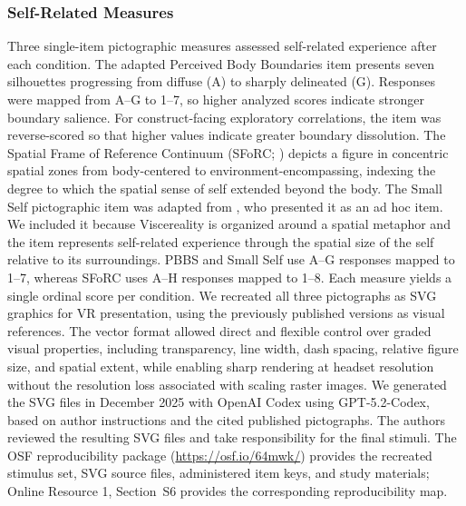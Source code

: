 \documentclass[pdflatex,sn-basic,lineno]{sn-jnl}
\begin{document}
\subsubsection{Self-Related Measures}\label{subsubsec:measures_self}
Three single-item pictographic measures assessed self-related experience after each
condition. The adapted Perceived Body Boundaries item \citep{Dambrun2016} presents seven
silhouettes progressing from diffuse (A) to sharply delineated (G). Responses were mapped
from A--G to 1--7, so higher analyzed scores indicate stronger boundary salience. For
construct-facing exploratory correlations, the item was reverse-scored so that higher
values indicate greater boundary dissolution. The Spatial Frame of Reference
Continuum (SFoRC; \citealt{Hanley2020}) depicts a figure in concentric spatial zones
from body-centered to environment-encompassing, indexing the degree to which the
spatial sense of self extended beyond the body. The Small Self pictographic item was
adapted from \citet{vidal2025inducing}, who presented it as an ad hoc item. We included
it because Viscereality is organized around a spatial metaphor and the item represents
self-related experience through the spatial size of the self relative to its surroundings.
PBBS and Small Self use A--G responses mapped to 1--7, whereas SFoRC uses A--H
responses mapped to 1--8. Each measure yields a single ordinal score per condition.
We recreated all three pictographs
as SVG graphics for VR presentation, using the previously published versions as visual
references. The vector format allowed direct and flexible control over graded visual
properties, including transparency, line width, dash spacing, relative figure size, and
spatial extent, while enabling sharp rendering at headset resolution without the
resolution loss associated with scaling raster images. We generated the SVG files in
December 2025 with OpenAI Codex using GPT-5.2-Codex, based on author instructions
and the cited published pictographs. The authors reviewed the resulting SVG files and
take responsibility for the final stimuli. The OSF reproducibility package
(\url{https://osf.io/64mwk/}) provides the recreated stimulus set, SVG source files,
administered item keys, and study materials; Online Resource 1, Section~S6 provides the corresponding
reproducibility map.
\end{document}
